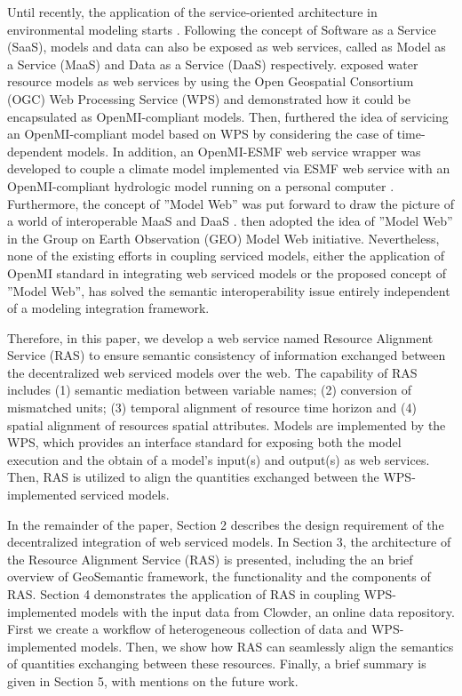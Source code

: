 \documentclass[review]{elsarticle}
\begin{document}
Until recently, the application of the service-oriented architecture in environmental modeling starts \citep{castronova2013, mineter2003, granell2010, goodall2011, goodall2013}. Following the concept of Software as a Service (SaaS), models and data can also be exposed as web services, called as Model as a Service (MaaS) and Data as a Service (DaaS) respectively. \cite{goodall2011} exposed water resource models as web services by using the Open Geospatial Consortium (OGC) Web Processing Service (WPS) and demonstrated how it could be encapsulated as OpenMI-compliant models. Then, \cite{castronova2013} furthered the idea of servicing an OpenMI-compliant model based on WPS by considering the case of time-dependent models. In addition, an OpenMI-ESMF web service wrapper was developed to couple a climate model implemented via ESMF web service with an OpenMI-compliant hydrologic model running on a personal computer \citep{goodall2013}. Furthermore, the concept of ''Model Web'' was put forward to draw the picture of a world of interoperable MaaS and DaaS \citep{geller2007, geller2008}. \cite{nativi2013} then adopted the idea of ''Model Web'' in the Group on Earth Observation (GEO) Model Web initiative. Nevertheless, none of the existing efforts in coupling serviced models, either the application of OpenMI standard in integrating web serviced models or the proposed concept of ''Model Web'', has solved the semantic interoperability issue entirely independent of a modeling integration framework. 

Therefore, in this paper, we develop a web service named Resource Alignment Service (RAS) to ensure semantic consistency of information exchanged between the decentralized web serviced models over the web. The capability of RAS includes (1) semantic mediation between variable names; (2) conversion of mismatched units; (3) temporal alignment of resource time horizon and (4) spatial alignment of resources spatial attributes. Models are implemented by the WPS, which provides an interface standard for exposing both the model execution and the obtain of a model's input(s) and output(s) as web services. Then, RAS is utilized to align the quantities exchanged between the WPS-implemented serviced models.

In the remainder of the paper, Section 2 describes the design requirement of the decentralized integration of web serviced models. In Section 3, the architecture of the Resource Alignment Service (RAS) is presented, including the an brief overview of GeoSemantic framework, the functionality and the components of RAS. Section 4 demonstrates the application of RAS in coupling WPS-implemented models with the input data from Clowder, an online data repository. First we create a workflow of heterogeneous collection of data and WPS-implemented models. Then, we show how RAS can seamlessly align the semantics of quantities exchanging between these resources. Finally, a brief summary is given in Section 5, with mentions on the future work. 
\end{document}
